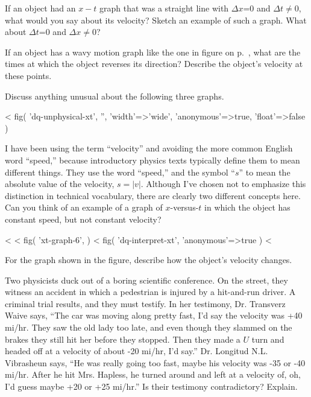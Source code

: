 \begin{dq}
If an object had an $x-t$ graph that was a straight line with
$\Delta x$=0 and $\Delta t\ne0$, what would you say about its
velocity?  Sketch an example of such a graph. What about
$\Delta t$=0 and $\Delta x\ne0$?
\end{dq}

\begin{dq}
If an object has a wavy motion graph like the one in
figure  on p.~\pageref{fig:xt-graph-6}, what are the times at
which the object reverses its direction?  Describe
the object's velocity at these points.
\end{dq}

\begin{dq}
Discuss anything unusual about the following three graphs.
\end{dq}

<%
  fig(
    'dq-unphysical-xt',
    '',
    {
      'width'=>'wide',
      'anonymous'=>true,
      'float'=>false
    }
  )

\begin{dq}
I have been using the term ``velocity'' and avoiding the
more common English word ``speed,'' because introductory
physics texts typically define them to mean different things.  They
use the word ``speed,'' and the symbol ``$s$'' to mean the
absolute value of the velocity, $s=|v|$.  Although I've chosen not to
emphasize this distinction in technical vocabulary, there
are clearly two different concepts here.  Can you think of
an example of a graph of $x$-versus-$t$ in which the object has
constant speed, but not constant velocity?
\end{dq}

<%
<%
  fig(
    'xt-graph-6',
  )
\spacebetweenfigs
<%
  fig(
    'dq-interpret-xt',
    {
      'anonymous'=>true
    }
  )
<%
\begin{dq}\label{dq:interpret-xt}
For the graph shown in the figure, describe how the object's velocity changes.
\end{dq}

\begin{dq}
Two physicists duck out of a boring scientific conference.  On the street, they witness an
accident in which a pedestrian is injured by a hit-and-run
driver.  A criminal trial results, and they must testify.
In her testimony, Dr. Transverz Waive says, ``The car was
moving along pretty fast, I'd say the velocity was +40
mi/hr.  They saw the old lady too late, and even though they
slammed on the brakes they still hit her before they
stopped.  Then they made a $U$ turn and headed off at a
velocity of about -20 mi/hr, I'd say.''  Dr. Longitud N.L.
Vibrasheun says, ``He was really going too fast, maybe his
velocity was -35 or -40 mi/hr.  After he hit Mrs. Hapless,
he turned around and left at a velocity of, oh, I'd guess
maybe +20 or +25 mi/hr.''  Is their testimony contradictory?  Explain.
\end{dq}

